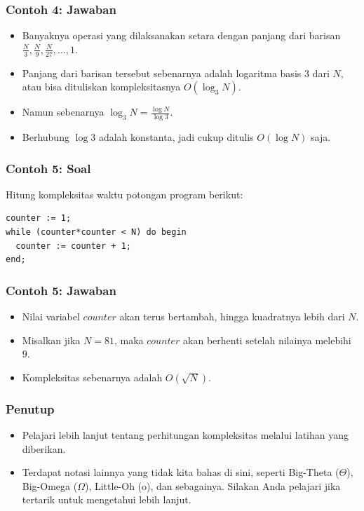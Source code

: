 \documentclass{beamer}
\begin{document}
\begin{frame}
\frametitle{Contoh 4: Jawaban}
\begin{itemize}
	\item Banyaknya operasi yang dilaksanakan setara dengan panjang dari barisan $\frac{N}{3}, \frac{N}{9}, \frac{N}{27}, ..., 1$.
	\item Panjang dari barisan tersebut sebenarnya adalah logaritma basis 3 dari $N$, atau bisa dituliskan kompleksitasnya $O(\log_3{N})$.
	\item Namun sebenarnya $\log_3{N} = \frac{\log{N}}{\log{3}}$.
	\item Berhubung $\log{3}$ adalah konstanta, jadi cukup ditulis $O(\log{N})$ saja.
\end{itemize}
\end{frame}

\begin{frame}[fragile]
\frametitle{Contoh 5: Soal}
Hitung kompleksitas waktu potongan program berikut:

\hfill

\begin{lstlisting}
counter := 1;
while (counter*counter < N) do begin
  counter := counter + 1;
end;
\end{lstlisting}
\end{frame}

\begin{frame}
\frametitle{Contoh 5: Jawaban}
\begin{itemize}
	\item Nilai variabel $counter$ akan terus bertambah, hingga kuadratnya lebih dari $N$.
	\item Misalkan jika $N = 81$, maka $counter$ akan berhenti setelah nilainya melebihi $9$.
	\item Kompleksitas sebenarnya adalah $O(\sqrt{N})$.
\end{itemize}
\end{frame}

\begin{frame}
\frametitle{Penutup}
\begin{itemize}
	\item Pelajari lebih lanjut tentang perhitungan kompleksitas melalui latihan yang diberikan.
	\item Terdapat notasi lainnya yang tidak kita bahas di sini, seperti Big-Theta ($\Theta$), Big-Omega ($\Omega$), Little-Oh (o), dan sebagainya. Silakan Anda pelajari jika tertarik untuk mengetahui lebih lanjut.
\end{itemize}
\end{frame}
\end{document}
